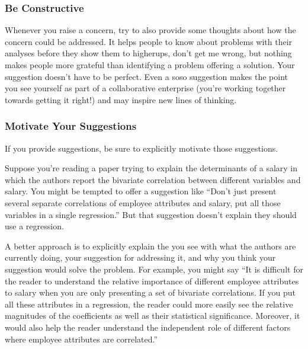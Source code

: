\documentclass[letterpaper,10pt,english]{jupyterBook}
\begin{document}
\subsubsection{Be Constructive}
\label{\detokenize{40_in_practice/30_giving_feedback:be-constructive}}
\sphinxAtStartPar
Whenever you raise a concern, try to also provide some thoughts about how the concern could be addressed. It helps people to know about problems with their analyses before they show them to higher\sphinxhyphen{}ups, don’t get me wrong, but nothing makes people more grateful than identifying a problem  offering a solution. Your suggestion doesn’t have to be perfect. Even a so\sphinxhyphen{}so suggestion makes the point you see yourself as part of a collaborative enterprise (you’re working together towards getting it right!) and may inspire new lines of thinking.


\subsubsection{Motivate Your Suggestions}
\label{\detokenize{40_in_practice/30_giving_feedback:motivate-your-suggestions}}
\sphinxAtStartPar
If you provide suggestions, be sure to explicitly motivate those suggestions.

\sphinxAtStartPar
Suppose you’re reading a paper trying to explain the determinants of a salary in which the authors report the bivariate correlation between different variables and salary. You might be tempted to offer a suggestion like “Don’t just present several separate correlations of employee attributes and salary, put all those variables in a single regression.” But that suggestion doesn’t explain  they should use a regression.

\sphinxAtStartPar
A better approach is to explicitly explain the  you see with what the authors are currently doing, your suggestion for addressing it, and why you think your suggestion would solve the problem. For example, you might say “It is difficult for the reader to understand the relative importance of different employee attributes to salary when you are only presenting a set of bivariate correlations. If you put all these attributes in a regression, the reader could more easily see the relative magnitudes of the coefficients as well as their statistical significance. Moreover, it would also help the reader understand the independent role of different factors where employee attributes are correlated.”
\end{document}
